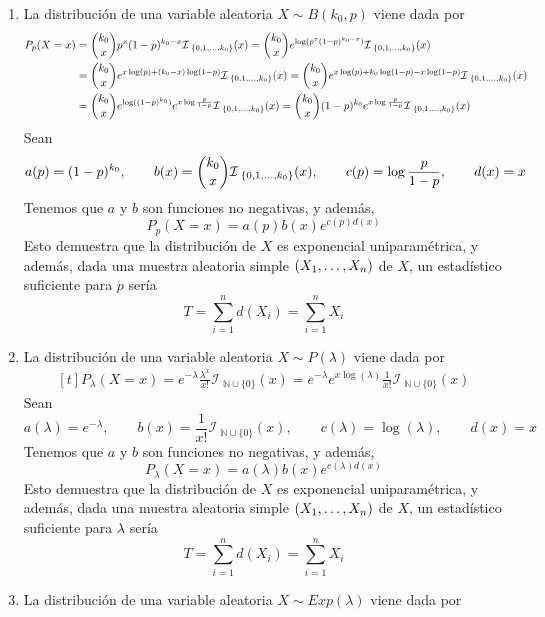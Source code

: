 \documentclass[11pt]{report}
\makeatletter
\renewenvironment{proof}[1][\proofname]{\par
  \pushQED{\qed}%
  \normalfont \topsep\z@skip %
  \trivlist
  \item[\hskip\labelsep
        \itshape
    #1\@addpunct{.}]\ignorespaces
}{%
  \popQED\endtrivlist\@endpefalse
}
\newcommand{\N}{\mathbb N}
\makeatother
\begin{document}
\begin{proof}
  \hfill
  \begin{enumerate}
    \item La distribución de una variable aleatoria $X \sim B(k_0,p)$ viene dada por
    \[
    \begin{aligned}[t]  
    P_p(X=x) &= \binom{k_0}{x}p^{x}(1-p)^{k_0-x} \mathcal{I}_{\, \, \{0,1,\mathellipsis,k_0\}}(x) = \binom{k_0}{x}e^{\log(p^x(1-p)^{k_0-x})}\mathcal{I}_{\, \, \{0,1,\mathellipsis,k_0\}}(x) \\ &= \binom{k_0}{x}e^{x\log(p)+(k_0-x)\log(1-p)} \mathcal{I}_{\, \, \{0,1,\mathellipsis,k_0\}}(x)=\binom{k_0}{x}e^{x\log(p)+k_0\log(1-p)-x\log(1-p)} \mathcal{I}_{\, \, \{0,1,\mathellipsis,k_0\}}(x) \\ &=\binom{k_0}{x}e^{\log((1-p)^{k_0})}e^{x\log\frac{p}{1-p}} \mathcal{I}_{\, \, \{0,1,\mathellipsis,k_0\}}(x)=\binom{k_0}{x}(1-p)^{k_0}e^{x\log\frac{p}{1-p}} \mathcal{I}_{\, \, \{0,1,\mathellipsis,k_0\}}(x)
    \end{aligned}\]
    Sean
    \[a(p) = (1-p)^{k_0}, \qquad b(x) = \binom{k_0}{x}\mathcal{I}_{\, \, \{0,1,\mathellipsis,k_0\}}(x), \qquad c(p) = \log\frac{p}{1-p}, \qquad d(x) = x\]
    Tenemos que $a$ y $b$ son funciones no negativas, y además,
    \[P_p(X=x) = a(p)b(x)e^{c(p)d(x)}\]
    Esto demuestra que la distribución de $X$ es exponencial uniparamétrica, y además, dada una muestra aleatoria simple $(X_1,\mathellipsis,X_n)$ de $X$, un estadístico suficiente para $p$ sería
    \[T=\sum_{i=1}^n d(X_i) = \sum_{i=1}^n X_i\]
    \item La distribución de una variable aleatoria $X \sim P(\lambda)$ viene dada por
    \[\begin{aligned}[t]
      P_\lambda(X=x) = e^{-\lambda} \frac{\lambda^x}{x!} \mathcal{I}_{\, \, \N \cup \{0\} }(x) = e^{-\lambda}e^{x\log(\lambda)} \frac{1}{x!} \mathcal{I}_{\, \, \N \cup \{0\} }(x)
    \end{aligned}\]
    Sean
    \[a(\lambda) = e^{-\lambda}, \qquad b(x) = \frac{1}{x!}\mathcal{I}_{\, \, \N \cup \{0\} }(x), \qquad c(\lambda) = \log(\lambda), \qquad d(x) = x\]
    Tenemos que $a$ y $b$ son funciones no negativas, y además,
    \[P_\lambda(X=x) = a(\lambda)b(x)e^{c(\lambda)d(x)}\]
    Esto demuestra que la distribución de $X$ es exponencial uniparamétrica, y además, dada una muestra aleatoria simple $(X_1,\mathellipsis,X_n)$ de $X$, un estadístico suficiente para $\lambda$ sería
    \[T=\sum_{i=1}^n d(X_i) = \sum_{i=1}^n X_i\]
    \item La distribución de una variable aleatoria $X \sim Exp(\lambda)$ viene dada por

\end{enumerate}
\end{proof}
\end{document}
